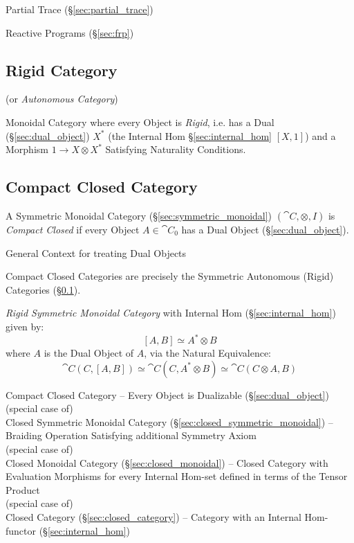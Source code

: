 Partial Trace (\S\ref{sec:partial_trace})

Reactive Programs (\S\ref{sec:frp})



\subsection{Rigid Category}\label{sec:rigid_category}

(or \emph{Autonomous Category})

Monoidal Category where every Object is \emph{Rigid}, i.e. has a Dual
(\S\ref{sec:dual_object}) $X^*$ (the Internal Hom
\S\ref{sec:internal_hom} $[X,1]$) and a Morphism $1 \rightarrow
X \otimes X^*$ Satisfying Naturality Conditions.



\subsection{Compact Closed Category}\label{sec:compact_closed}

A Symmetric Monoidal Category (\S\ref{sec:symmetric_monoidal})
$(\cat{C}, \otimes, I)$ is \emph{Compact Closed} if every Object $A
\in \cat{C}_0$ has a Dual Object (\S\ref{sec:dual_object}).

General Context for treating Dual Objects

Compact Closed Categories are precisely the Symmetric Autonomous
(Rigid) Categories (\S\ref{sec:rigid_category}).

\emph{Rigid Symmetric Monoidal Category} with Internal Hom
(\S\ref{sec:internal_hom}) given by:
\[
  [A,B] \simeq A^* \otimes B
\]
where $A$ is the Dual Object of $A$, via the Natural Equivalence:
\[
  \cat{C}(C,[A,B]) \simeq \cat{C}(C,A^* \otimes B)
    \simeq \cat{C}(C \otimes A, B)
\]

Compact Closed Category -- Every Object is Dualizable
(\S\ref{sec:dual_object}) \\
(special case of) \\
Closed Symmetric Monoidal Category
(\S\ref{sec:closed_symmetric_monoidal})
-- Braiding Operation Satisfying additional Symmetry Axiom \\
(special case of) \\
Closed Monoidal Category (\S\ref{sec:closed_monoidal}) -- Closed
Category with Evaluation Morphisms for every Internal Hom-set defined
in terms of the Tensor Product \\
(special case of) \\
Closed Category (\S\ref{sec:closed_category}) -- Category with an
Internal Hom-functor (\S\ref{sec:internal_hom})

